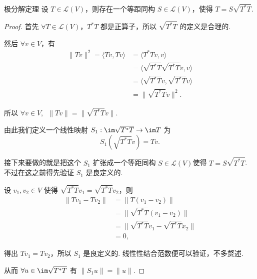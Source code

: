 \begin{theorem}{极分解定理}{} 
    设 $ T \in \mathcal{L}(V) $，则存在一个等距同构 $ S \in \mathcal{L}(V) $，使得 $ T = S\sqrt{T^*T} $.
\end{theorem}

\begin{proof}
    首先 $ \forall T \in \mathcal{L}(V) $，$ T^{*}T $ 都是正算子，所以 $ \sqrt{T^*T} $ 的定义是合理的.

    然后 $ \forall v \in V $，有
    \begin{align*}
        \lVert Tv \rVert^2 = \langle Tv, Tv \rangle & = \langle T^*Tv, v \rangle                   \\
                                                    & = \langle \sqrt{T^*T}\sqrt{T^*T}v, v \rangle \\
                                                    & = \langle \sqrt{T^*T}v, \sqrt{T^*T}v \rangle \\
                                                    & = \lVert \sqrt{T^*T}v \rVert^2.
    \end{align*}

    所以 $ \forall v \in V ,\enspace \lVert Tv \rVert = \lVert \sqrt{T^*T}v \rVert $.

    由此我们定义一个线性映射 $ S_1: \im \sqrt{T^*T} \rightarrow \im T $ 为
    \[ S_1(\sqrt{T^*T}v) = Tv. \]

    接下来要做的就是把这个 $ S_1 $ 扩张成一个等距同构 $ S \in \mathcal{L}(V) $使得 $ T = S\sqrt{T^*T} $. 不过在这之前得先验证 $ S_1 $ 是良定义的.

    设 $ v_1, v_2 \in V $ 使得 $ \sqrt{T^*T}v_1 = \sqrt{T^*T}v_2 $，则
    \begin{align*}
        \lVert Tv_1 - Tv_2 \rVert & = \lVert T(v_1 - v_2) \rVert                    \\
                                  & = \lVert \sqrt{T^*T}(v_1 - v_2)\rVert           \\
                                  & = \lVert \sqrt{T^*T}v_1 - \sqrt{T^*T}x_2 \rVert \\
                                  & = 0,
    \end{align*}

    得出 $ Tv_1 = Tv_2 $，所以 $ S_1 $ 是良定义的. 线性性结合范数便可以验证，不多赘述.

    从而 $ \forall u \in \im \sqrt{T^*T} $ 有 $ \lVert S_1u \rVert = \lVert u \rVert $.


\end{proof}
